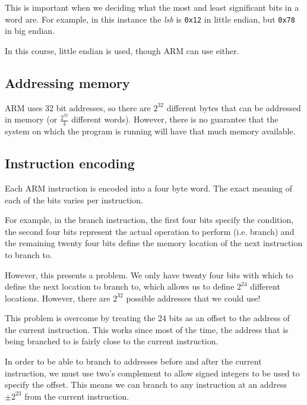 This is important when we deciding what the most and least significant bits in a
word are. For example, in this instance the {\it lsb} is {\tt 0x12} in little
endian, but {\tt 0x78} in big endian.

In this course, little endian is used, though ARM can use either.


\subsection{Addressing memory}

ARM uses 32 bit addresses, so there are $2^{32}$ different bytes that can be
addressed in memory (or $\frac{2^{32}}{4}$ different words). However, there is
no guarantee that the system on which the program is running will have that much
memory available.

\subsection{Instruction encoding}

Each ARM instruction is encoded into a four byte word. The exact meaning of each
of the bits varies per instruction.

For example, in the branch instruction, the first four bits specify the
condition, the second four bits represent the actual operation to perform (i.e.
branch) and the remaining twenty four bits define the memory location of the
next instruction to branch to.

However, this presents a problem. We only have twenty four bits with which to
define the next location to branch to, which allows us to define $2^{24}$
different locations. However, there are $2^{32}$ possible addresses that we
could use!

This problem is overcome by treating the 24 bits as an offset to the address of
the current instruction. This works since most of the time, the address that is
being branched to is fairly close to the current instruction.

In order to be able to branch to addresses before and after the current
instruction, we must use two's complement to allow signed integers to be used to
specify the offset. This means we can branch to any instruction at an address
$\pm 2^{23}$ from the current instruction.

